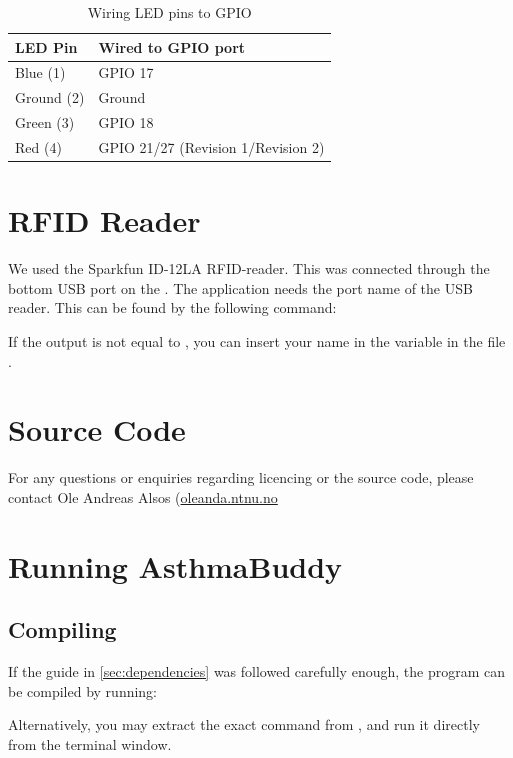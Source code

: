 \begin{table}[H]
\centering
\begin{tabular}{|p{3.0cm}| p{3.0cm}|}
	\hline
	\textbf{LED Pin} & \textbf{Wired to GPIO port}\\
	\hline
	Blue (1) & GPIO 17\\
	\hline
	Ground (2) & Ground\\
	\hline
	Green (3) & GPIO 18\\
	\hline
	Red (4) & GPIO 21/27 (Revision 1/Revision 2)\\
	\hline
\end{tabular}
\caption{Wiring LED pins to GPIO}
\label{tab:wiringgpio}
\end{table}

\section{RFID Reader}
We used the Sparkfun ID-12LA RFID-reader. This was connected through the bottom USB port on the \rpi{}. 
The application needs the port name of the USB reader. This can be found by the following command: 


If the output is not equal to , you can insert your name in the variable  in the file . 
 
\section{Source Code}
\label{sec:sourcecode}
For any questions or enquiries regarding licencing or the source code, please contact Ole Andreas Alsos (\href{mailto:oleanda@idi.ntnu.no}{oleanda\@idi.ntnu.no} 


\section{Running AsthmaBuddy}

\subsection{Compiling}
If the guide in \ref{sec:dependencies} was followed carefully enough, the program can be compiled by running:


Alternatively, you may extract the exact command from , and run it directly from the terminal window. 

